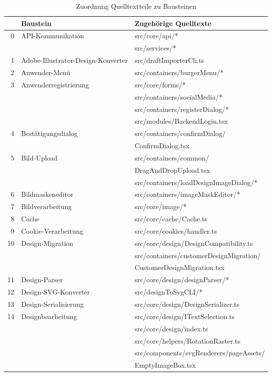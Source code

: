 
    \begin{longtable}{r@{\hspace{5mm}}lX}
    \caption{Zuordnung Quelltextteile zu Bausteinen} \\
    \label{table:c^ompMap}
    & \textbf{Baustein} & \textbf{Zugehörige Quelltexte} \\
    \hline
    \hline
    0 & API-Kommunikation & src/core/api/* \\
        & & src/services/* \\
    \hline
    1 & Adobe-Illustrator-Design-Konverter & src/draftImporterCli.ts \\
    \hline
    2 & Anwender-Menü & src/containers/burgerMenu/* \\
    \hline
    3 & Anwenderregistrierung & src/core/forms/* \\
        & & src/containers/socialMedia/* \\
        & & src/containers/registerDialog/* \\
        & & src/modules/BackendLogin.tsx \\
    \hline
    4 & Bestätigungsdialog & src/containers/confirmDialog/ \\ & & \> ConfirmDialog.tsx \\
    \hline
    5 & Bild-Upload & src/containers/common/ \\ & & \> DragAndDropUpload.tsx \\
        & & src/containers/loadDesignImageDialog/* \\
    \hline
    6 & Bildmaskeneditor & src/containers/imageMaskEditor/* \\
    \hline
    7 & Bildverarbeitung & src/core/image/* \\
    \hline
    8 & Cache & src/core/cache/Cache.ts \\
    \hline
    9 & Cookie-Verarbeitung & src/core/cookies/handler.ts \\
    \hline
    10 & Design-Migration & src/core/design/DesignCompatibility.ts \\
        & & src/containers/customerDesignMigration/ \\ & & \> CustomerDesignMigration.tsx \\
    \hline
    11 & Design-Parser & src/core/design/designParser/* \\
    \hline
    12 & Design-SVG-Konverter & src/designToSvgCLI/* \\
    \hline
    13 & Design-Serialisierung & src/core/design/DesignSerializer.ts \\
    \hline
    14 & Designbearbeitung & src/core/design/ITextSelection.ts \\
        & & src/core/design/index.ts \\
        & & src/core/helpers/RotationRaster.ts \\
        & & src/components/svgRenderers/pageAssets/ \\ & & \> EmptyImageBox.tsx \\
    \hline


\end{longtable}
